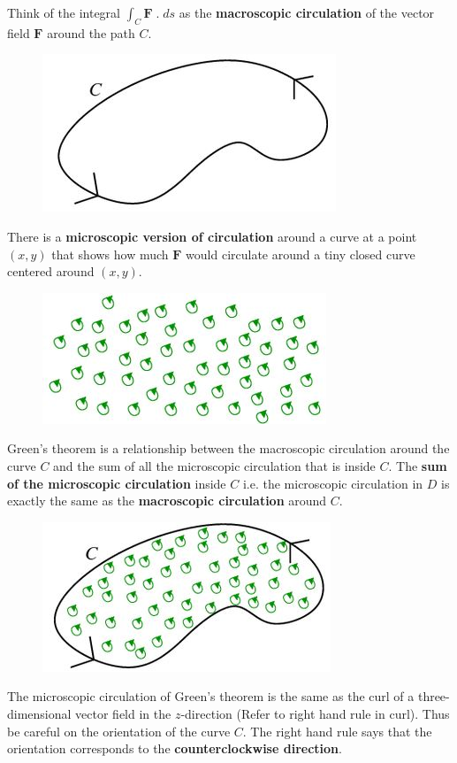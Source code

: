 \documentclass[10pt,a4paper]{article}
\begin{document}
Think of the integral $\int_C \textbf{F}\;.\;ds$  as the \textbf{macroscopic circulation} of the
vector field $\textbf{F}$ around the path $C$. \par
\begin{figure} [h!]
    \centering
    \includegraphics[scale=0.6]{flow.JPG}
\end{figure}
There is a \textbf{microscopic version of circulation} around a curve at a point $(x,y)$ that shows
how much $\textbf{F}$ would circulate around a tiny closed curve centered around $(x,y)$. \par
\begin{figure} [h!]
    \centering
    \includegraphics[scale=0.6]{micro.JPG}
\end{figure}
Green's theorem is a relationship between the macroscopic circulation around the curve $C$ and the
sum of all the microscopic circulation that is inside $C$. The \textbf{sum of the microscopic circulation} inside
$C$ i.e. the microscopic circulation in $D$ is exactly the same as the \textbf{macroscopic
circulation} around $C$. \par
\begin{figure} [h!]
    \centering
    \includegraphics[scale=0.6]{combined.JPG}
\end{figure}
The microscopic circulation of Green's theorem is the same as the curl of a three-dimensional vector
field in the $z$-direction (Refer to right hand rule in curl). Thus be careful on the orientation of
the curve $C$. The right hand rule says that the orientation corresponds to the \textbf{counterclockwise direction}.
\end{document}
